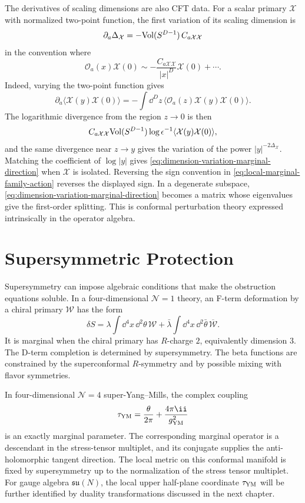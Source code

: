 The derivatives of scaling dimensions are also CFT data.  For a scalar
primary \(\mathcal X\) with normalized two-point function, the first variation
of its scaling dimension is
\begin{equation}
  \partial_a\Delta_{\mathcal X}
  =
  -{\rm Vol}(S^{D-1})\,C_{a\mathcal X\mathcal X}
  \label{eq:dimension-variation-marginal-direction}
\end{equation}
in the convention where
\[
  \mathcal O_a(x)\mathcal X(0)
  \sim
  -\frac{C_{a\mathcal X\mathcal X}}{|x|^D}\mathcal X(0)+\cdots .
\]
Indeed, varying the two-point function gives
\[
  \partial_a\langle\mathcal X(y)\mathcal X(0)\rangle
  =
  -\int\dd^Dz\,
  \langle\mathcal O_a(z)\mathcal X(y)\mathcal X(0)\rangle .
\]
The logarithmic divergence from the region \(z\to0\) is then
\[
  C_{a\mathcal X\mathcal X}
  {\rm Vol}(S^{D-1})\log\epsilon^{-1}
  \langle\mathcal X(y)\mathcal X(0)\rangle ,
\]
and the same divergence near \(z\to y\) gives the variation of the power
\(|y|^{-2\Delta_{\mathcal X}}\).  Matching the coefficient of
\(\log |y|\) gives \eqref{eq:dimension-variation-marginal-direction} when
\(\mathcal X\) is isolated.  Reversing the sign convention in
\eqref{eq:local-marginal-family-action} reverses the displayed sign.  In a
degenerate subspace,
\eqref{eq:dimension-variation-marginal-direction} becomes a matrix whose
eigenvalues give the first-order splitting.  This is conformal perturbation
theory expressed intrinsically in the operator algebra.

\section{Supersymmetric Protection}

Supersymmetry can impose algebraic conditions that make the obstruction
equations soluble.  In a four-dimensional \(\mathcal N=1\) theory, an
F-term deformation by a chiral primary \(\mathcal W\) has the form
\[
  \delta S
  =
  \lambda\int\dd^4x\,\dd^2\theta\,\mathcal W
  +\bar\lambda\int\dd^4x\,\dd^2\bar\theta\,\overline{\mathcal W}.
\]
It is marginal when the chiral primary has \(R\)-charge \(2\), equivalently
dimension \(3\).  The D-term completion is determined by supersymmetry.
The beta functions are constrained by the superconformal \(R\)-symmetry and by
possible mixing with flavor symmetries.

In four-dimensional \(\mathcal N=4\) super-Yang--Mills, the complex coupling
\[
  \tau_{\rm YM}=\frac{\theta}{2\pi}+\frac{4\pi\ii}{g_{\rm YM}^2}
\]
is an exactly marginal parameter.  The corresponding marginal operator is a
descendant in the stress-tensor multiplet, and its conjugate supplies the
anti-holomorphic tangent direction.  The local metric on this conformal
manifold is fixed by supersymmetry up to the normalization of the stress
tensor multiplet.  For gauge algebra \(\mathfrak{su}(N)\), the local upper
half-plane coordinate \(\tau_{\rm YM}\) will be further identified by
duality transformations discussed in the next chapter.

